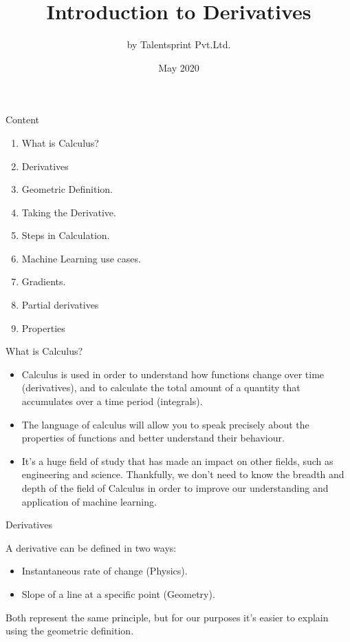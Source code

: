 \documentclass{beamer}
\title{Introduction to Derivatives}
\author{by Talentsprint Pvt.Ltd.}
\date{May 2020}
\begin{document}
\maketitle
\begin{frame}{Content}
	\begin{enumerate}
		\item What is Calculus? 
		\item Derivatives
		\item Geometric Definition.
		\item Taking the Derivative.
		\item Steps in Calculation.
		\item Machine Learning use cases.
		\item Gradients.
		\item Partial derivatives
		\item Properties
	\end{enumerate}
\end{frame}
\begin{frame}{What is Calculus?}
\begin{itemize}
    \item Calculus is used in order to understand how functions change over time (derivatives), and to calculate the total amount of a quantity that accumulates over a time period (integrals). 
\vspace{10pt}
    \item The language of calculus will allow you to speak precisely about the properties of functions and better understand their behaviour.\\
\vspace{10pt}
    \item It’s a huge field of study that has made an impact on other fields, such as engineering and science. Thankfully, we don’t need to know the breadth and depth of the field of Calculus in order to improve our understanding and application of machine learning.\\
\end{itemize}
\end{frame}
\begin{frame}{Derivatives}
	\begin{flushleft}
		A derivative can be defined in two ways:
	\end{flushleft}
\vspace{-10pt}
	\begin{itemize}
		\item Instantaneous rate of change (Physics).
		\item Slope of a line at a specific point (Geometry).
	\end{itemize}
	\begin{flushleft}
		Both represent the same principle, but for our purposes it’s easier to explain using the geometric definition.
	\end{flushleft}
\end{frame}
\end{document}
